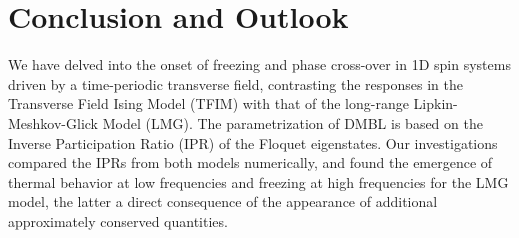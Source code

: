 \documentclass[%
reprint,
superscriptaddress,
linenumbers,
amsmath,amssymb,
aps,
prb,
showkeys,
]{revtex4-2}
\begin{document}
	
	
	\section{\label{sec:level7}Conclusion and Outlook}
	
	We have delved into the onset of freezing and phase cross-over in 1D spin systems driven by a time-periodic transverse field, contrasting the responses in the Transverse Field Ising Model (TFIM) with that of the long-range Lipkin-Meshkov-Glick Model (LMG). The parametrization of DMBL is based on the Inverse Participation Ratio (IPR) of the Floquet eigenstates. Our investigations compared the IPRs from both models numerically, and found the emergence of thermal behavior at low frequencies and freezing at high frequencies for the LMG model, the latter a direct consequence of the appearance of additional approximately conserved quantities.
\end{document}
